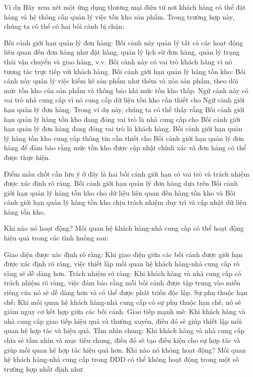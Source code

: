 Ví dụ
Hãy xem xét một ứng dụng thương mại điện tử nơi khách hàng có thể đặt hàng và hệ thống cần quản lý việc tồn kho sản phẩm. Trong trường hợp này, chúng ta có thể có hai bối cảnh bị chặn:

Bối cảnh giới hạn quản lý đơn hàng: Bối cảnh này quản lý tất cả các hoạt động liên quan đến đơn hàng như đặt hàng, quản lý lịch sử đơn hàng, quản lý trạng thái vận chuyển và giao hàng, v.v. Bối cảnh này có vai trò khách hàng vì nó tương tác trực tiếp với khách hàng.
Bối cảnh giới hạn quản lý hàng tồn kho: Bối cảnh này quản lý việc kiểm kê sản phẩm như thêm và xóa sản phẩm, theo dõi mức tồn kho của sản phẩm và thông báo khi mức tồn kho thấp. Ngữ cảnh này có vai trò nhà cung cấp vì nó cung cấp dữ liệu tồn kho cần thiết cho Ngữ cảnh giới hạn quản lý đơn hàng.
Trong ví dụ này, chúng ta có thể thấy rằng Bối cảnh giới hạn quản lý hàng tồn kho đang đóng vai trò là nhà cung cấp cho Bối cảnh giới hạn quản lý đơn hàng đang đóng vai trò là khách hàng. Bối cảnh giới hạn quản lý hàng tồn kho cung cấp thông tin cần thiết cho Bối cảnh giới hạn quản lý đơn hàng để đảm bảo rằng mức tồn kho được cập nhật chính xác và đơn hàng có thể được thực hiện.

Điểm mấu chốt cần lưu ý ở đây là hai bối cảnh giới hạn có vai trò và trách nhiệm được xác định rõ ràng. Bối cảnh giới hạn quản lý đơn hàng dựa trên Bối cảnh giới hạn quản lý hàng tồn kho cho dữ liệu liên quan đến hàng tồn kho và Bối cảnh giới hạn quản lý hàng tồn kho chịu trách nhiệm duy trì và cập nhật dữ liệu hàng tồn kho.

Khi nào nó hoạt động?
Mối quan hệ khách hàng-nhà cung cấp có thể hoạt động hiệu quả trong các tình huống sau:

Giao diện được xác định rõ ràng: Khi giao diện giữa các bối cảnh được giới hạn được xác định rõ ràng, việc thiết lập mối quan hệ khách hàng-nhà cung cấp rõ ràng sẽ dễ dàng hơn.
Trách nhiệm rõ ràng: Khi khách hàng và nhà cung cấp có trách nhiệm rõ ràng, việc đảm bảo rằng mỗi bối cảnh được tập trung vào miền riêng của nó sẽ dễ dàng hơn và có thể được phát triển độc lập.
Sự phụ thuộc hạn chế: Khi mối quan hệ khách hàng-nhà cung cấp có sự phụ thuộc hạn chế, nó sẽ giảm nguy cơ kết hợp giữa các bối cảnh.
Giao tiếp mạnh mẽ: Khi khách hàng và nhà cung cấp giao tiếp hiệu quả và thường xuyên, điều đó sẽ giúp thiết lập mối quan hệ hợp tác và hiệu quả.
Tầm nhìn chung: Khi khách hàng và nhà cung cấp chia sẻ tầm nhìn và mục tiêu chung, điều đó sẽ tạo điều kiện cho sự hợp tác và giúp mối quan hệ hợp tác hiệu quả hơn.
Khi nào nó không hoạt động?
Mối quan hệ khách hàng-nhà cung cấp trong DDD có thể không hoạt động trong một số trường hợp nhất định như:

